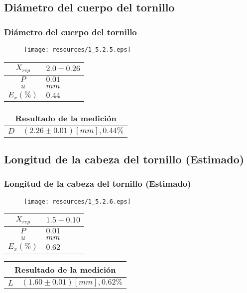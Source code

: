 \documentclass[letter,11pt]{beamer}
\begin{document}
\subsection{Diámetro del cuerpo del tornillo}
\begin{frame}
\frametitle{Diámetro del cuerpo del tornillo}
\vspace*{0.8cm}
\begin{figure}
\centering
\texttt{[image: resources/1\_5.2.5.eps]}
\end{figure}
\vspace*{0.4cm}
\scriptsize
\begin{tabular}{|c|>{\centering}m{1.8cm}<{\centering}|}
\hline
$X_{rep}$ &  $2.0+0.26$ \tabularnewline \hline
      $P$ &      $0.01$ \tabularnewline \hline
      $u$ &        $mm$ \tabularnewline \hline
$E_x(\%)$ &      $0.44$ \tabularnewline \hline
\end{tabular}
\quad
\begin{tabular}{|c|>{\centering}m{5.7cm}<{\centering}|}
\hline
\multicolumn{2}{|c|}{\textbf{Resultado de la medición}} \\ \hline
$D$ & $( 2.26\pm0.01)[mm], 0.44\%$ \tabularnewline \hline
\end{tabular}
\end{frame}

\subsection{Longitud de la cabeza del tornillo (Estimado)}
\begin{frame}
\frametitle{Longitud de la cabeza del tornillo (Estimado)}
\vspace*{0.8cm}
\begin{figure}
\centering
\texttt{[image: resources/1\_5.2.6.eps]}
\end{figure}
\vspace*{0.4cm}
\scriptsize
\begin{tabular}{|c|>{\centering}m{1.8cm}<{\centering}|}
\hline
$X_{rep}$ &  $1.5+0.10$ \tabularnewline \hline
      $P$ &      $0.01$ \tabularnewline \hline
      $u$ &        $mm$ \tabularnewline \hline
$E_x(\%)$ &      $0.62$ \tabularnewline \hline
\end{tabular}
\quad
\begin{tabular}{|c|>{\centering}m{5.7cm}<{\centering}|}
\hline
\multicolumn{2}{|c|}{\textbf{Resultado de la medición}} \\ \hline
$L$ & $( 1.60\pm0.01)[mm], 0.62\%$ \tabularnewline \hline
\end{tabular}
\end{frame}
\end{document}
